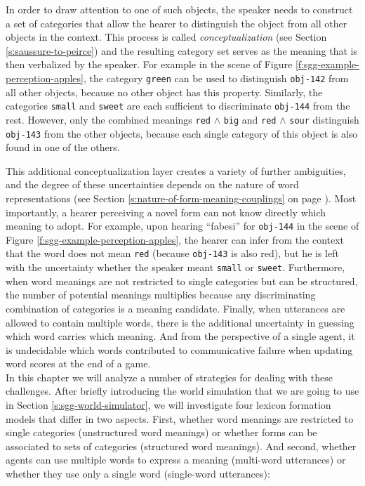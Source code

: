 In order to draw attention to one of such objects, the speaker needs
to construct a set of categories that allow the hearer to distinguish
the object from all other objects in the context. This process is
called \emph{conceptualization} (see Section
\ref{s:saussure-to-peirce}) and the resulting category set serves as
the meaning that is then verbalized by the speaker. For example in the
scene of Figure \ref{f:sgg-example-perception-apples}, the category
\texttt{green} can be used to distinguish \texttt{obj-142} from all
other objects, because no other object has this property. Similarly,
the categories \texttt{small} and \texttt{sweet} are each sufficient
to discriminate \texttt{obj-144} from the rest. However, only the
combined meanings \texttt{red} $\wedge$ \texttt{big} and \texttt{red}
$\wedge$ \texttt{sour} distinguish \texttt{obj-143} from the other
objects, because each single category of this object is also found in
one of the others.


This additional conceptualization layer creates a variety of further
ambiguities, and the degree of these uncertainties depends on the
nature of word representations (see Section
\ref{s:nature-of-form-meaning-couplings} on page
\pageref{s:nature-of-form-meaning-couplings}). Most importantly, a hearer
perceiving a novel form can not know directly which meaning to
adopt. For example, upon hearing ``fabesi'' for \texttt{obj-144} in
the scene of Figure \ref{f:sgg-example-perception-apples}, the hearer
can infer from the context that the word does not mean \texttt{red}
(because \texttt{obj-143} is also red), but he is left with the
uncertainty whether the speaker meant \texttt{small} or
\texttt{sweet}. Furthermore, when word meanings are not restricted to
single categories but can be structured, the number of potential
meanings multiplies because any discriminating combination of
categories is a meaning candidate. Finally, when utterances are
allowed to contain multiple words, there is the additional uncertainty
in guessing which word carries which meaning. And from the perspective
of a single agent, it is undecidable which words contributed to
communicative failure when updating word scores at the end of a game.\\

\noindent In this chapter we will analyze a number of strategies for dealing
with these challenges. After briefly introducing the world simulation
that we are going to use in Section \ref{s:sgg-world-simulator}, we
will investigate four lexicon formation models that differ in two
aspects. First, whether word meanings are restricted to single
categories (unstructured word meanings) or whether forms can be
associated to sets of categories (structured word meanings). And
second, whether agents can use multiple words to express a meaning
(multi-word utterances) or whether
they use only a single word (single-word utterances):\\

